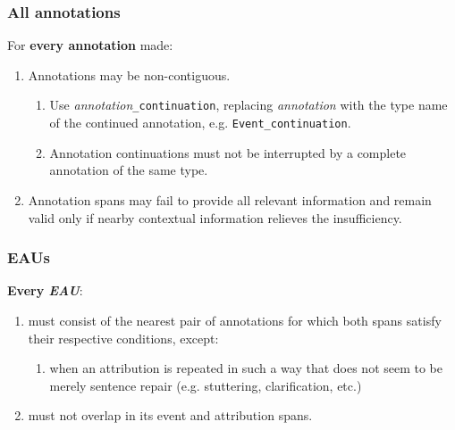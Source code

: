 \documentclass[a4paper,12pt]{article}
\begin{document}
    \subsubsection{All annotations}
    For \textbf{every annotation} made:
        \begin{enumerate}
            \item Annotations may be non-contiguous.
                \begin{enumerate}
                    \item Use \emph{annotation}\texttt{\_continuation}, replacing \emph{annotation} with the type name of the continued annotation, e.g. \texttt{Event\_continuation}.
                    \item Annotation continuations must not be interrupted by a complete annotation of the same type.
                \end{enumerate}
            \item Annotation spans may fail to provide all relevant information and remain valid only if nearby contextual information relieves the insufficiency.
        \end{enumerate}


    \subsubsection{EAUs}
    \textbf{Every \emph{EAU}}:
        \begin{enumerate}
            \item must consist of the nearest pair of annotations for which both spans satisfy their respective conditions, except:
                \begin{enumerate}
                    \item when an attribution is repeated in such a way that does not seem to be merely sentence repair (e.g. stuttering, clarification, etc.)
                \end{enumerate}
            \item must not overlap in its event and attribution spans.
        \end{enumerate}
\end{document}
